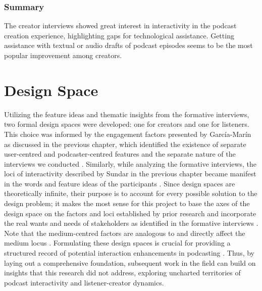 \documentclass[12pt]{report}
\begin{document}
\begin{myfont}
        \subsubsection{Summary}
        \indent The creator interviews showed great interest in interactivity in the podcast creation experience, highlighting gaps for technological assistance. Getting assistance with textual or audio drafts of podcast episodes seems to be the most popular improvement among creators.
        
        \section{Design Space}
        \indent Utilizing the feature ideas and thematic insights from the formative interviews, two formal design spaces were developed: one for creators and one for listeners. This choice was informed by the engagement factors presented by García-Marín as discussed in the previous chapter, which identified the existence of separate user-centred and podcaster-centred features and the separate nature of the interviews we conducted \citep{GarciaMarin2020}. Similarly, while analyzing the formative interviews, the loci of interactivity described by Sundar in the previous chapter became manifest in the words and feature ideas of the participants \citep{Sundar2010Designing}. Since design spaces are theoretically infinite, their purpose is to account for every possible solution to the design problem; it makes the most sense for this project to base the axes of the design space on the factors and loci established by prior research and incorporate the real wants and needs of stakeholders as identified in the formative interviews \citep{Westerlund2005DesignSpace}. Note that the medium-centred factors are analogous to and directly affect the medium locus \citep{Sundar2010Designing}\citep{GarciaMarin2020}. Formulating these design spaces is crucial for providing a structured record of potential interaction enhancements in podcasting \citep{Westerlund2005DesignSpace}. Thus, by laying out a comprehensive foundation, subsequent work in the field can build on insights that this research did not address, exploring uncharted territories of podcast interactivity and listener-creator dynamics.
        

\end{myfont}
\end{document}
